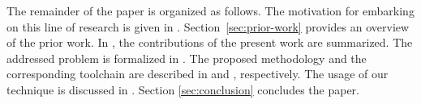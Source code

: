 The remainder of the paper is organized as follows. The motivation for embarking
on this line of research is given in .
Section~\ref{sec:prior-work} provides an overview of the prior work. In
, the contributions of the present work are summarized. The
addressed problem is formalized in . The proposed
methodology and the corresponding toolchain are described in 
and , respectively. The usage of our technique is discussed in
. Section \ref{sec:conclusion} concludes the paper.

